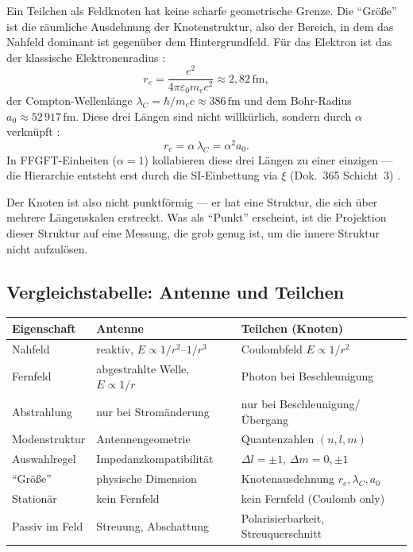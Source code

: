Ein Teilchen als Feldknoten hat keine scharfe geometrische Grenze.
Die ``Größe'' ist die räumliche Ausdehnung der Knotenstruktur,
also der Bereich, in dem das Nahfeld dominant ist gegenüber dem
Hintergrundfeld. Für das Elektron ist das der klassische
Elektronenradius \EM:
\[
  r_e = \frac{e^2}{4\pi\varepsilon_0 m_e c^2} \approx 2{,}82\,\mathrm{fm},
\]
der Compton-Wellenlänge $\lambda_C = \hbar/m_e c \approx 386\,\mathrm{fm}$
und dem Bohr-Radius $a_0 \approx 52\,917\,\mathrm{fm}$. Diese drei
Längen sind nicht willkürlich, sondern durch $\alpha$ verknüpft \cite{Jackson1999,PascherDok365}:
\[
  r_e = \alpha\,\lambda_C = \alpha^2 a_0.
\]
In FFGFT-Einheiten ($\alpha=1$) kollabieren diese drei Längen zu einer
einzigen --- die Hierarchie entsteht erst durch die SI-Einbettung via
$\xi$ (Dok.~365 Schicht~3) \KM.

Der Knoten ist also nicht punktförmig --- er hat eine Struktur, die
sich über mehrere Längenskalen erstreckt. Was als ``Punkt'' erscheint,
ist die Projektion dieser Struktur auf eine Messung, die grob genug
ist, um die innere Struktur nicht aufzulösen.

\subsection*{Vergleichstabelle: Antenne und Teilchen}

\begin{center}
\begin{tabular}{@{}lll@{}}
\toprule
\textbf{Eigenschaft} & \textbf{Antenne} & \textbf{Teilchen (Knoten)} \\
\midrule
Nahfeld & reaktiv, $E\propto 1/r^2$--$1/r^3$ & Coulombfeld $E\propto 1/r^2$ \\
Fernfeld & abgestrahlte Welle, $E\propto 1/r$ & Photon bei Beschleunigung \\
Abstrahlung & nur bei Stromänderung & nur bei Beschleunigung/Übergang \\
Modenstruktur & Antennengeometrie & Quantenzahlen $(n,l,m)$ \\
Auswahlregel & Impedanzkompatibilität & $\Delta l=\pm1$, $\Delta m=0,\pm1$ \\
``Größe'' & physische Dimension & Knotenausdehnung $r_e,\lambda_C,a_0$ \\
Stationär & kein Fernfeld & kein Fernfeld (Coulomb only) \\
Passiv im Feld & Streuung, Abschattung & Polarisierbarkeit, Streuquerschnitt \\
\bottomrule
\end{tabular}
\end{center}

